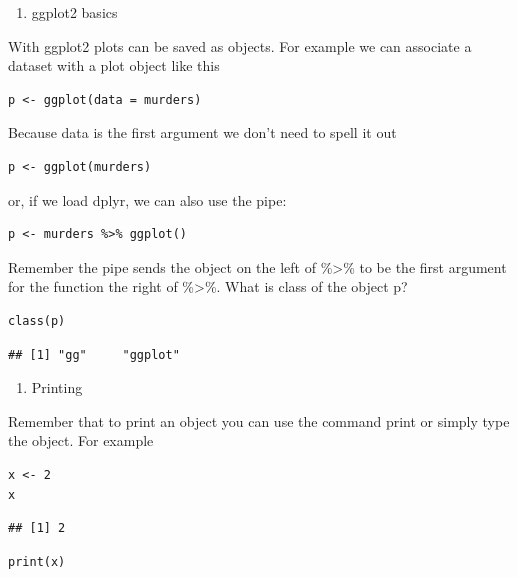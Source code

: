 \documentclass[
]{article}
\providecommand{\tightlist}{%
  \setlength{\itemsep}{0pt}\setlength{\parskip}{0pt}}
\begin{document}
\begin{enumerate}
\def\labelenumi{\arabic{enumi}.}
\tightlist
\item
  ggplot2 basics
\end{enumerate}

With ggplot2 plots can be saved as objects. For example we can associate
a dataset with a plot object like this

\begin{verbatim}
p <- ggplot(data = murders)
\end{verbatim}

Because data is the first argument we don't need to spell it out

\begin{verbatim}
p <- ggplot(murders)
\end{verbatim}

or, if we load dplyr, we can also use the pipe:

\begin{verbatim}
p <- murders %>% ggplot()
\end{verbatim}

Remember the pipe sends the object on the left of \%\textgreater\% to be
the first argument for the function the right of \%\textgreater\%. What
is class of the object p?

\begin{verbatim}
class(p)
\end{verbatim}

\begin{verbatim}
## [1] "gg"     "ggplot"
\end{verbatim}

\begin{enumerate}
\def\labelenumi{\arabic{enumi}.}
\setcounter{enumi}{1}
\tightlist
\item
  Printing
\end{enumerate}

Remember that to print an object you can use the command print or simply
type the object. For example

\begin{verbatim}
x <- 2
x
\end{verbatim}

\begin{verbatim}
## [1] 2
\end{verbatim}

\begin{verbatim}
print(x)
\end{verbatim}
\end{document}
